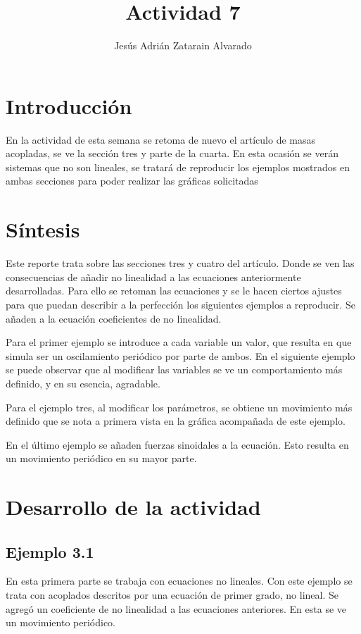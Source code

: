 \documentclass{article}
\title{Actividad 7}
\author{Jesús Adrián Zatarain Alvarado}
\begin{document}
\maketitle

\section{Introducción}

En la actividad de esta semana se retoma de nuevo el artículo de masas acopladas, se ve la sección tres y parte de la cuarta. En esta ocasión se verán sistemas que no son lineales, se tratará de reproducir los ejemplos mostrados en ambas secciones para poder realizar las gráficas solicitadas

\section{Síntesis}

Este reporte trata sobre las secciones tres y cuatro del artículo. Donde se ven las consecuencias de añadir no linealidad a las ecuaciones anteriormente desarrolladas. Para ello se retoman las ecuaciones y se le hacen ciertos ajustes para que puedan describir a la perfección los siguientes ejemplos a reproducir.
Se añaden a la ecuación coeficientes de no linealidad.

Para el primer ejemplo se introduce a cada variable un valor, que resulta  en que simula ser un oscilamiento periódico por parte de ambos. En el siguiente ejemplo se puede observar que al modificar las variables se ve un comportamiento más definido, y en su esencia, agradable.

Para el ejemplo tres, al modificar los parámetros, se obtiene un movimiento más definido que se nota a primera vista en la gráfica acompañada de este ejemplo.

En el último ejemplo se añaden fuerzas sinoidales a la ecuación. Esto resulta en un movimiento periódico  en su mayor parte.



\section{Desarrollo de la actividad}

\subsection{Ejemplo 3.1}

En esta primera parte se trabaja con ecuaciones no lineales. Con este ejemplo se trata con acoplados descritos por una ecuación de primer grado, no lineal. Se agregó un coeficiente de no linealidad a las ecuaciones anteriores. En esta se ve un movimiento periódico.
\end{document}
